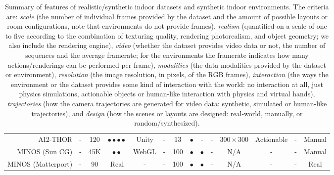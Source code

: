 \begin{table}[!t]
{\begin{tabular}{|r|c|c|c|c|c|c|c|c|c|c|c|c|c|}
        AI2-THOR \cite{Kolve2017} & - & 120 & $\bullet\bullet\bullet\bullet$ & Unity & - & 13 & $\bullet$ & - & - & $300\times300$ & Actionable & - & Manual\\
        MINOS (Sun CG) \cite{Savva2017} & - & 45K & $\bullet\bullet$ & WebGL & - & 100 & $\bullet$ & $\bullet$ & - & N/A &  - & - & Manual\\
        MINOS (Matterport) \cite{Savva2017} & - & 90 & Real & - & - & 100 & $\bullet$ & $\bullet$ & - & N/A &  - & - & Real\\
      \hline
      \end{tabular}
    }
    \caption{Summary of features of realistic/synthetic indoor datasets and synthetic indoor environments. The criteria are: \emph{scale} (the number of individual frames provided by the dataset and the amount of possible layouts or room configurations, note that environments do not provide frames), \emph{realism} (quantified on a scale of one to five according to the combination of texturing quality, rendering photorealism, and object geometry; we also include the rendering engine), \emph{video} (whether the dataset provides video data or not, the number of sequences and the average framerate; for the environments the framerate indicates how many actions/renderings can be performed per frame), \emph{modalities} (the data modalities provided by the dataset or environment), \emph{resolution} (the image resolution, in pixels, of the RGB frames), \emph{interaction} (the ways the environment or the dataset provides some kind of interaction with the world: no interaction at all, just physics simulations, actionable objects or human-like interaction with physics and virtual hands), \emph{trajectories} (how the camera trajectories are generated for video data: synthetic, simulated or human-like trajectories), and \emph{design} (how the scenes or layouts are designed: real-world, manually, or random/synthesized).}
    \label{table:sim2real:dataset_features}
  \end{table}

